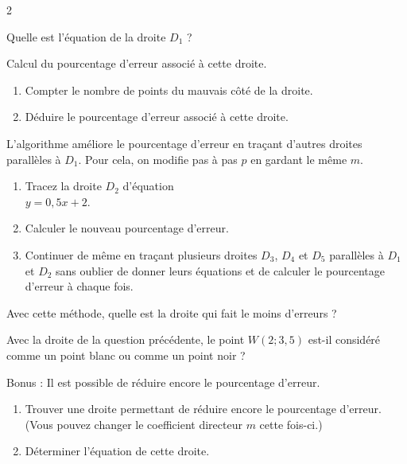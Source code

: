 	\vspace{0.3cm}

	\begin{multicols}{2}

		\begin{MADenumerate}
			\item Quelle est l'équation de la droite $D_1$ ?

			\item Calcul du pourcentage d'erreur associé à cette droite.
			\begin{enumerate}
				\item Compter le nombre de points du mauvais côté de la droite.
				\item Déduire le pourcentage d'erreur associé à cette droite.

			\end{enumerate}
			\item L'algorithme améliore le pourcentage d'erreur en traçant d'autres droites parallèles à $D_1$. Pour cela, on modifie pas à pas $p$ en gardant le même $m$.
			\begin{enumerate}
				\item Tracez la droite $D_2$ d'équation \\$y=0{,}5x+2$.
				\item Calculer le nouveau pourcentage d'erreur.
				\item Continuer de même en traçant plusieurs droites $D_3$, $D_4$ et $D_5$ parallèles à $D_1$ et $D_2$ sans oublier de donner leurs équations et de calculer le pourcentage d'erreur à chaque fois.

			\end{enumerate}
			\item Avec cette méthode, quelle est la droite qui fait le moins d'erreurs ?
			\item Avec la droite de la question précédente, le point $W(2;3{,}5)$ est-il considéré comme un point blanc ou comme un point noir ?

			\item Bonus : Il est possible
			de réduire encore le pourcentage d'erreur.
			\begin{enumerate}
				\item Trouver une droite permettant de réduire encore le pourcentage d'erreur. (Vous pouvez changer le coefficient directeur $m$ cette fois-ci.)
				\item Déterminer l'équation de cette droite.
			\end{enumerate}

		\end{MADenumerate}

	\end{multicols}
